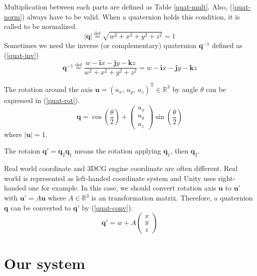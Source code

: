 \documentclass[journal]{IEEEtran}
\begin{document}
Multiplication between each parts are defined as Table \ref{quat-mult}.
Also, (\ref{quat-norm}) always have to be valid.
When a quaternion holds this condition, it is called to be normalized.
\begin{equation}
    |\bm{q}| \overset{\mathrm{def}}{=} \sqrt{w^2 + x^2 + y^2 + z^2} = 1 \label{quat-norm} 
\end{equation}
Sometimes we need the inverse (or complementary) quaternion \(\bm{q}^{-1}\) defined as (\ref{quat-inv})
\begin{equation}
    \bm{q}^{-1} \overset{\mathrm{def}}{=} \frac{w - \mathbf{i}x - \mathbf{j}y - \mathbf{k}z}{w^2 + x^2 + y^2 + z^2} = w - \mathbf{i}x - \mathbf{j}y - \mathbf{k}z \label{quat-inv}
\end{equation}

The rotation around the axis \(\bm{u} = (u_x,\,u_y,\,u_z)^\mathrm{T}\in\mathbb{R}^3\) by angle \(\theta\) can be expressed in (\ref{quat-rot}).
\begin{equation}
    \bm{q} = \cos\left(\frac{\theta}{2}\right) + \begin{pmatrix}
        u_x \\
        u_y \\
        u_z
    \end{pmatrix} \sin\left(\frac{\theta}{2}\right) \label{quat-rot}
\end{equation}
where \(|\bm{u}| = 1\).

The rotaion \(\bm{q}' = \bm{q}_2\bm{q}_1\) means the rotation applying \(\bm{q}_1\), then \(\bm{q}_2\).

Real world coordinate and 3DCG engine coordinate are often different.
Real world is represented as left-handed coordinate system and Unity uses right-handed one for example.
In this case, we should convert rotation axis \(\bm{u}\) to \(\bm{u}'\) with \(\bm{u}' = A\bm{u}\) where \(A\in\mathbb{R}^3\) is an transformation matrix.
Therefore, a quaternion \(\bm{q}\) can be converted to \(\bm{q}'\) by (\ref{quat-conv}).
\begin{equation}
    \bm{q}' = w + A\begin{pmatrix}
        x \\
        y \\
        z
    \end{pmatrix} \label{quat-conv}
\end{equation}

\section{Our system}
\end{document}
